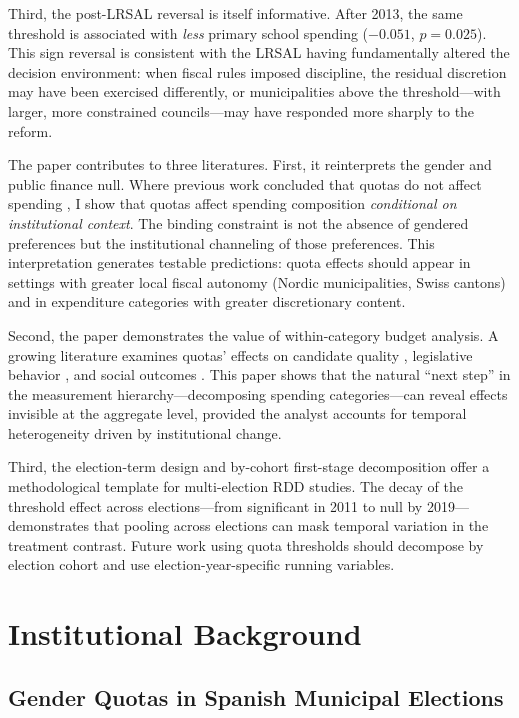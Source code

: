 \documentclass[12pt]{article}
\begin{document}
Third, the post-LRSAL reversal is itself informative. After 2013, the same threshold is associated with \emph{less} primary school spending ($-0.051$, $p = 0.025$). This sign reversal is consistent with the LRSAL having fundamentally altered the decision environment: when fiscal rules imposed discipline, the residual discretion may have been exercised differently, or municipalities above the threshold---with larger, more constrained councils---may have responded more sharply to the reform.

The paper contributes to three literatures. First, it reinterprets the gender and public finance null. Where previous work concluded that quotas do not affect spending \citep{ferreira2014does, bagues2021can}, I show that quotas affect spending composition \emph{conditional on institutional context}. The binding constraint is not the absence of gendered preferences but the institutional channeling of those preferences. This interpretation generates testable predictions: quota effects should appear in settings with greater local fiscal autonomy (Nordic municipalities, Swiss cantons) and in expenditure categories with greater discretionary content.

Second, the paper demonstrates the value of within-category budget analysis. A growing literature examines quotas' effects on candidate quality \citep{baltrunaite2014quotas, besley2017gender}, legislative behavior \citep{washington2008female, lippmann2022gender}, and social outcomes \citep{bhalotra2014health, iyer2012female}. This paper shows that the natural ``next step'' in the measurement hierarchy---decomposing spending categories---can reveal effects invisible at the aggregate level, provided the analyst accounts for temporal heterogeneity driven by institutional change.

Third, the election-term design and by-cohort first-stage decomposition offer a methodological template for multi-election RDD studies. The decay of the threshold effect across elections---from significant in 2011 to null by 2019---demonstrates that pooling across elections can mask temporal variation in the treatment contrast. Future work using quota thresholds should decompose by election cohort and use election-year-specific running variables.

\section{Institutional Background}

\subsection{Gender Quotas in Spanish Municipal Elections}
\end{document}
